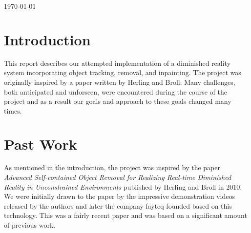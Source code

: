 \documentclass[12pt]{article}
\begin{document}
\begin{titlepage}

{\large \today}\\[3cm] %


 

\vfill %

\end{titlepage}
\section{Introduction}
This report describes our attempted implementation of a diminished reality system incorporating object tracking, removal, and inpainting. The project was originally inspired by a paper written by Herling and Broll. Many challenges, both anticipated and unforseen, were encountered during the course of the project and as a result our goals and approach to these goals changed many times. 

\section{Past Work}
As mentioned in the introduction, the project was inspired by the paper \textit{Advanced Self-contained Object Removal for Realizing Real-time Diminished Reality in Unconstrained Environments } published by Herling and Broll in 2010. We were initially drawn to the paper by the impressive demonstration videos released by the authors and later the company fayteq founded based on this technology. This was a fairly recent paper and was based on a significant amount of previous work. 
\end{document}
